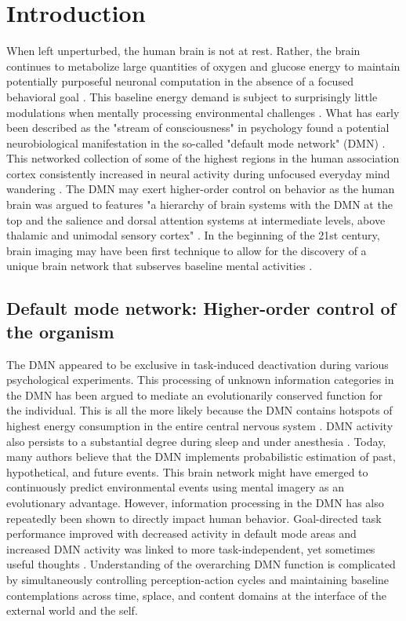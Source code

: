 \documentclass[10pt,letterpaper]{article}
\begin{document}
\section{Introduction}
%
When left unperturbed, the human brain is not at rest.
Rather, the brain continues to metabolize large quantities of
oxygen and glucose energy to maintain
potentially purposeful neuronal computation
in the absence of a focused behavioral goal
\citep{kenet2003spontaneously, fiser2004small}.
This baseline energy demand is subject to surprisingly little modulations
when mentally processing environmental challenges
\citep{raichle2001pnas}.
What has early been described as the "stream of consciousness"
in psychology \citep{james1890principles}
found a potential neurobiological manifestation
in the so-called "default mode network" (DMN)
\citep{shul1997}. This networked collection of some of the highest regions in
the human association cortex \citep{mesulam1998sensation, margulies2016situating}
consistently
increased in neural activity during
unfocused everyday mind wandering \citep{raichle2001pnas}.
The DMN may exert higher-order control on behavior
as the human brain was argued to features "a hierarchy of brain systems with
the DMN at the top and the salience and dorsal attention systems
at intermediate levels, above thalamic and unimodal sensory
cortex" \citep{carhart2010default}.
In the beginning of the 21st century,
brain imaging may have been first technique
to allow for the discovery of a unique brain network that subserves
baseline mental activities
\citep{raichle2001pnas, bzdok2015resting}.


\subsection{Default mode network: Higher-order control of the organism}
The DMN appeared to be exclusive in task-induced
deactivation during various psychological experiments.
This processing of unknown information categories in the DMN has
been argued to mediate an evolutionarily conserved function for the individual.
This is all the more likely because the DMN contains hotspots
of highest energy consumption in the entire central nervous system
\citep{raichle2001pnas}.
DMN activity also persists to a substantial degree during
sleep and under anesthesia \citep{randy2008}.
Today, many authors believe that the DMN implements
probabilistic estimation of past, hypothetical, and future events. This
brain network
might have emerged to continuously predict environmental events using
mental imagery as an evolutionary advantage.
%
However, information processing in the DMN has also repeatedly
been shown to directly impact human behavior. Goal-directed task performance
improved with decreased activity in default mode areas \citep{weiss2006}
and increased DMN activity was linked to more task-independent,
yet sometimes useful thoughts
\citep{mason2007, seli2016mind}.
%
Understanding of the overarching DMN function is complicated by
simultaneously controlling perception-action cycles and
maintaining baseline contemplations
across time, splace, and content domains
at the interface of the external world and the self.
\end{document}
